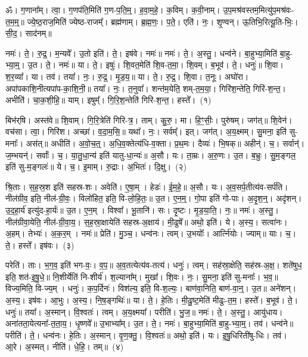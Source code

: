 \newcommand{\akhkhi}{\char"0916\char"094D\char"0916\char"093F\char"E009\hspace{-2ex} \char"E009\hspace{1.2ex}}

\label{sec:start_RudraPadaPatha}

ॐ। ग॒णाना᳚म्। त्वा॒। ग॒णप॑ति॒मिति॑ ग॒ण-प॒ति॒म्॒। ह॒वा॒म॒हे॒। क॒विम्। क॒वी॒नाम्। उ॒प॒मश्र॑वस्तम॒मित्यु॑प॒मश्र॑वः-त॒म॒म्॒॥ 
ज्ये॒ष्ठ॒राज॒मिति॑ ज्येष्ठ-राजम्᳚। ब्रह्म॑णाम्। ब्र॒ह्म॒णः॒। प॒ते॒। एति॑। नः॒। शृ॒ण्वन्। ऊ॒तिभि॒रित्यू॒ति-भिः॒। सी॒द॒। साद॑नम्॥ 


नमः॑। ते॒। रु॒द्र॒। म॒न्यवे᳚। उ॒तो इति॑। ते॒। इष॑वे। नमः॑॥ 
नमः॑। ते॒। अ॒स्तु॒। धन्व॑ने। बा॒हुभ्या॒मिति॑ बा॒हु-भ्या॒म्॒। उ॒त। ते॒। नमः॑॥ 
या। ते॒। इषुः॑। शि॒वत॒मेति॑ शि॒व-त॒मा॒। शि॒वम्। ब॒भूव॑। ते॒। धनुः॑॥ 
शि॒वा। श॒र॒व्या᳚। या। तव॑। तया᳚। नः॒। रु॒द्र॒। मृ॒ड॒य॒॥ 
या। ते॒। रु॒द्र॒। शि॒वा। त॒नूः। अघो॑रा। अपा॑पकाशि॒नीत्यपा॑प-का॒शि॒नी॒॥ 
तया᳚। नः॒। त॒नुवा᳚। शन्त॑म॒येति॒ शम्-त॒म॒या॒। गिरि॑श॒न्तेति॒ गिरि॑-श॒न्त॒। अभीति॑। चा॒क॒शी॒हि॒॥ 
याम्। इषुम्᳚। गि॒रि॒श॒न्तेति॑ गिरि-श॒न्त॒। हस्ते᳚।~(१)


बिभ॑र्‌षि। अस्त॑वे॥ 
शि॒वाम्। गि॒रि॒त्रेति॑ गिरि-त्र॒। ताम्। कु॒रु॒। मा। हि॒ꣳ॒सीः॒। पुरु॑षम्। जग॑त्॥ 
शि॒वेन॑। वच॑सा। त्वा॒। गिरि॑श। अच्छा॑। व॒दा॒म॒सि॒॥ 
यथा᳚। नः॒। सर्वम्᳚। इत्। जग॑त्। अ॒य॒क्ष्मम्। सु॒मना॒ इति॑ सु-मनाः᳚। अस॑त्॥ 
अधीति॑। अ॒वो॒च॒त्॒। अ॒धि॒व॒क्तेत्य॑धि-व॒क्ता। प्र॒थ॒मः। दैव्यः॑। भि॒षक्॥ 
अहीन्॑। च॒। सर्वान्॑। ज॒म्भयन्॑। सर्वाः᳚। च॒। या॒तु॒धा॒न्य॑ इति॑ यातु-धा॒न्यः॑॥ 
अ॒सौ। यः। ता॒म्रः। अ॒रु॒णः। उ॒त। ब॒भ्रुः। सु॒म॒ङ्गल॒ इति॑ सु-म॒ङ्गलः॑॥ 
ये। च॒। इ॒माम्। रु॒द्राः। अ॒भितः॑। दि॒क्षु।~(२)


श्रि॒ताः। स॒ह॒स्र॒श इति॑ सहस्र-शः। अवेति॑। ए॒षा॒म्। हेडः॑। ई॒म॒हे॒॥ 
अ॒सौ। यः। अ॒व॒सर्प॒तीत्य॑व-सर्प॑ति। नील॑ग्रीव॒ इति॒ नील॑-ग्री॒वः॒। विलो॑हित॒ इति॒ वि-लो॒हि॒तः॒॥ 
उ॒त। ए॒न॒म्॒। गो॒पा इति॑ गो-पाः। अ॒दृ॒श॒न्॒। अदृ॑शन्। उ॒द॒हा॒र्य॑ इत्यु॑द-हा॒र्यः॑॥ 
उ॒त। ए॒न॒म्। विश्वा᳚। भू॒तानि॑। सः। दृ॒ष्टः। मृ॒ड॒या॒ति॒। नः॒॥ 
नमः॑। अ॒स्तु॒। नील॑ग्रीवा॒येति॒ नील॑-ग्री॒वा॒य॒। स॒ह॒स्रा॒क्षायेति॑ सहस्र-अ॒क्षाय॑। मी॒ढुषे᳚॥
अथो॒ इति॑। ये। अ॒स्य॒। सत्वा॑नः। अ॒हम्। तेभ्यः॑। अ॒क॒र॒म्। नमः॑॥ 
प्रेति॑। मु॒ञ्च॒। धन्व॑नः। त्वम्। उ॒भयोः᳚। आर्त्नि॑योः। ज्याम्॥ 
याः। च॒। ते॒। हस्ते᳚। इष॑वः।~(३)


परेति॑। ताः। भ॒ग॒व॒ इति॑ भग-वः॒। व॒प॒॥ 
अ॒व॒तत्येत्य॑व-तत्य॑। धनुः॑। त्वम्। सह॑स्रा॒क्षेति॒ सह॑स्र-अ॒क्ष॒। शते॑षुध॒ इति॒ शत॑-इ॒षु॒धे॒॥ 
नि॒शीर्येति॑ नि-शीर्य॑। श॒ल्याना᳚म्। मुखा᳚। शि॒वः। नः॒। सु॒मना॒ इति॑ सु-मनाः᳚। भ॒व॒॥ 
विज्य॒मिति॒ वि-ज्य॒म्। धनुः॑। क॒प॒र्दिनः॑। विश॑ल्य॒ इति॒ वि-श॒ल्यः॒। बाण॑वा॒निति॒ बाण॑-वा॒न्॒। उ॒त॥ 
अने॑शन्। अ॒स्य॒। इष॑वः। आ॒भुः। अ॒स्य॒। नि॒ष॒ङ्गथिः॑॥ 
या। ते॒। हे॒तिः। मी॒ढु॒ष्ट॒मेति॑ मीढुः-त॒म॒। हस्ते᳚। ब॒भूव॑। ते॒। धनुः॑॥ 
तया᳚। अ॒स्मान्। वि॒श्वतः॑। त्वम्। अ॒य॒क्ष्मया᳚। परीति॑। भु॒ज॒॥ 
नमः॑। ते॒। अ॒स्तु॒। आयु॑धाय। अना॑तता॒येत्यना᳚-त॒ता॒य॒। धृ॒ष्णवे᳚॥ 
उ॒भाभ्या᳚म्। उ॒त। ते॒। नमः॑। बा॒हुभ्या॒मिति॑ बा॒हु-भ्या॒म्॒। तव॑। धन्व॑ने॥ 
परीति॑। ते॒। धन्व॑नः। हे॒तिः। अ॒स्मान्। वृ॒ण॒क्तु॒। वि॒श्वतः॑॥
 अथो॒ इति॑। यः। इ॒षु॒धिरिती॑षु-धिः। तव॑। आ॒रे। अ॒स्मत्। नीति॑। धे॒हि॒। तम्॥~(४)


